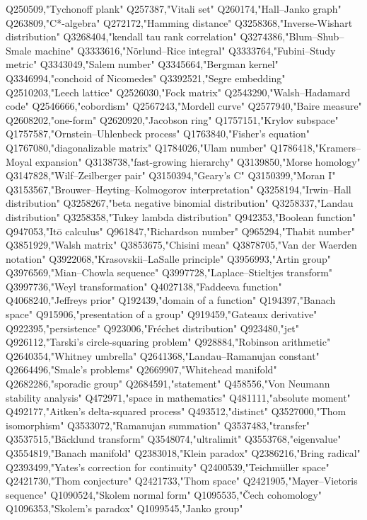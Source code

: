 Q250509,"Tychonoff plank"
Q257387,"Vitali set"
Q260174,"Hall–Janko graph"
Q263809,"C*-algebra"
Q272172,"Hamming distance"
Q3258368,"Inverse-Wishart distribution"
Q3268404,"kendall tau rank correlation"
Q3274386,"Blum–Shub–Smale machine"
Q3333616,"Nörlund–Rice integral"
Q3333764,"Fubini–Study metric"
Q3343049,"Salem number"
Q3345664,"Bergman kernel"
Q3346994,"conchoid of Nicomedes"
Q3392521,"Segre embedding"
Q2510203,"Leech lattice"
Q2526030,"Fock matrix"
Q2543290,"Walsh–Hadamard code"
Q2546666,"cobordism"
Q2567243,"Mordell curve"
Q2577940,"Baire measure"
Q2608202,"one-form"
Q2620920,"Jacobson ring"
Q1757151,"Krylov subspace"
Q1757587,"Ornstein–Uhlenbeck process"
Q1763840,"Fisher's equation"
Q1767080,"diagonalizable matrix"
Q1784026,"Ulam number"
Q1786418,"Kramers–Moyal expansion"
Q3138738,"fast-growing hierarchy"
Q3139850,"Morse homology"
Q3147828,"Wilf–Zeilberger pair"
Q3150394,"Geary's C"
Q3150399,"Moran I"
Q3153567,"Brouwer–Heyting–Kolmogorov interpretation"
Q3258194,"Irwin–Hall distribution"
Q3258267,"beta negative binomial distribution"
Q3258337,"Landau distribution"
Q3258358,"Tukey lambda distribution"
Q942353,"Boolean function"
Q947053,"Itō calculus"
Q961847,"Richardson number"
Q965294,"Thabit number"
Q3851929,"Walsh matrix"
Q3853675,"Chisini mean"
Q3878705,"Van der Waerden notation"
Q3922068,"Krasovskii–LaSalle principle"
Q3956993,"Artin group"
Q3976569,"Mian–Chowla sequence"
Q3997728,"Laplace–Stieltjes transform"
Q3997736,"Weyl transformation"
Q4027138,"Faddeeva function"
Q4068240,"Jeffreys prior"
Q192439,"domain of a function"
Q194397,"Banach space"
Q915906,"presentation of a group"
Q919459,"Gateaux derivative"
Q922395,"persistence"
Q923006,"Fréchet distribution"
Q923480,"jet"
Q926112,"Tarski's circle-squaring problem"
Q928884,"Robinson arithmetic"
Q2640354,"Whitney umbrella"
Q2641368,"Landau–Ramanujan constant"
Q2664496,"Smale's problems"
Q2669907,"Whitehead manifold"
Q2682286,"sporadic group"
Q2684591,"statement"
Q458556,"Von Neumann stability analysis"
Q472971,"space in mathematics"
Q481111,"absolute moment"
Q492177,"Aitken's delta-squared process"
Q493512,"distinct"
Q3527000,"Thom isomorphism"
Q3533072,"Ramanujan summation"
Q3537483,"transfer"
Q3537515,"Bäcklund transform"
Q3548074,"ultralimit"
Q3553768,"eigenvalue"
Q3554819,"Banach manifold"
Q2383018,"Klein paradox"
Q2386216,"Bring radical"
Q2393499,"Yates's correction for continuity"
Q2400539,"Teichmüller space"
Q2421730,"Thom conjecture"
Q2421733,"Thom space"
Q2421905,"Mayer–Vietoris sequence"
Q1090524,"Skolem normal form"
Q1095535,"Čech cohomology"
Q1096353,"Skolem's paradox"
Q1099545,"Janko group"
